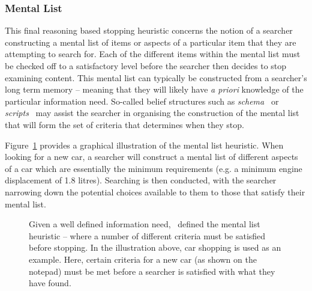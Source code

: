 \subsubsection{Mental List}\label{sec:stopping_background:heuristics:reasoning:list}
This final reasoning based stopping heuristic concerns the notion of a searcher constructing a mental list of items or aspects of a particular item that they are attempting to search for. Each of the different items within the mental list must be checked off to a satisfactory level before the searcher then decides to stop examining content. This mental list can typically be constructed from a searcher's long term memory -- meaning that they will likely have \emph{a priori} knowledge of the particular information need. So-called belief structures such as \emph{schema}~\citep{bartlett1933remembering} or \emph{scripts}~\citep{schank1977scripts} may assist the searcher in organising the construction of the mental list that will form the set of criteria that determines when they stop.

Figure~\ref{fig:mental_list} provides a graphical illustration of the mental list heuristic. When looking for a new car, a searcher will construct a mental list of different aspects of a car which are essentially the minimum requirements (e.g. a minimum engine displacement of 1.8 litres). Searching is then conducted, with the searcher narrowing down the potential choices available to them to those that satisfy their mental list.

\begin{figure}[t!]
    \centering
    \caption[The mental list stopping heuristic]{Given a well defined information need,~\cite{nickles1995judgment} defined the mental list heuristic – where a number of different criteria must be satisfied before stopping. In the illustration above, car shopping is used as an example. Here, certain criteria for a new car (as shown on the notepad) must be met before a searcher is satisfied with what they have found.}
    \label{fig:mental_list}
\end{figure}


